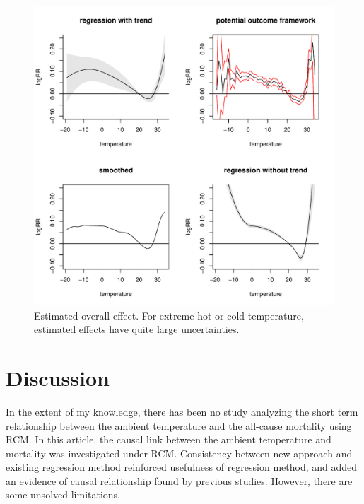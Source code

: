 \documentclass[12pt]{article}
\begin{document}
\begin{figure}
	\includegraphics[width = \textwidth]{figures/main1.pdf}
	\caption{Estimated overall effect. 
	For extreme hot or cold temperature, estimated effects have quite large uncertainties.}
	\label{figure:main}
\end{figure}


\section{Discussion}
\label{section:discussion}

In the extent of my knowledge, there has been no study analyzing the short term relationship 
between the ambient temperature and the all-cause mortality using RCM.
In this article, the causal link between the ambient temperature and mortality 
was investigated under RCM.
Consistency between new approach and existing regression method reinforced
usefulness of regression method, and added an evidence of causal relationship found by previous studies.
However, there are some unsolved limitations.
\end{document}
